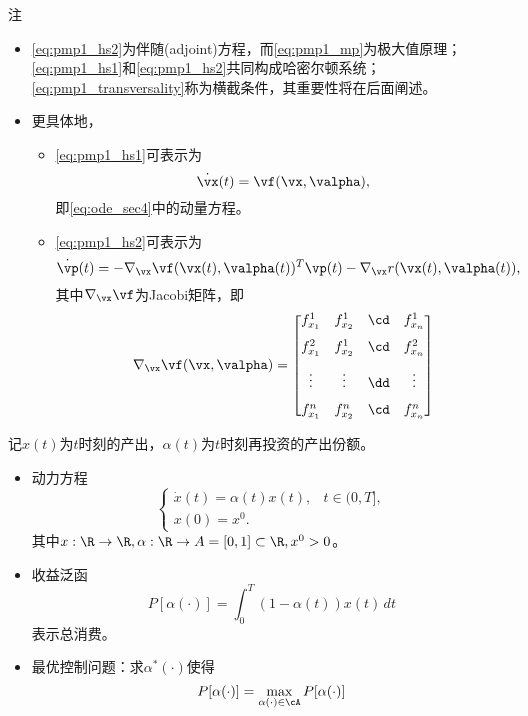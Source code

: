 \begin{frame}{\subsecname}
    \begin{block}{注}
    \begin{itemize}
        \item \eqref{eq:pmp1_hs2}为伴随(adjoint)方程，而\eqref{eq:pmp1_mp}为极大值原理；\eqref{eq:pmp1_hs1}和\eqref{eq:pmp1_hs2}共同构成哈密尔顿系统；\eqref{eq:pmp1_transversality}称为横截条件，其重要性将在后面阐述。
        \item 更具体地，
        \begin{itemize}
        \item \eqref{eq:pmp1_hs1}可表示为
        $$
        \dot \vx(t)=\vf(\vx,\valpha),
        $$
        即\eqref{eq:ode_sec4}中的动量方程。\\[.1in]
        \item \eqref{eq:pmp1_hs2}可表示为
        $$
        \dot \vp(t)= - \nabla_{\vx} \vf(\vx(t),\valpha(t))^T \vp(t) - \nabla_\vx r(\vx(t),\valpha(t)),
        $$
        其中$\nabla_{\vx} \vf$为Jacobi矩阵，即
        $$
        \nabla_{\vx} \vf(\vx,\valpha) =
        \begin{bmatrix}
        f_{x_1}^1 & f_{x_2}^1 & \cd & f_{x_n}^1  \\[.1in]
        f_{x_1}^2 & f_{x_2}^1 & \cd & f_{x_n}^2  \\[.1in]
        \vdots & \vdots & \dd & \vdots  \\[.1in]
        f_{x_1}^n & f_{x_2}^n & \cd & f_{x_n}^n  
        \end{bmatrix}
        $$
        \end{itemize}
    \end{itemize}
    \end{block}
\end{frame}

\begin{frame}{\subsecname}
\begin{example}[经济消费的简单控制问题]
 记$x(t)$为$t$时刻的产出，$\alpha(t)$为$t$时刻再投资的产出份额。
 \begin{itemize}
 \item 动力方程 
 $$
 \left\{
 \begin{array}{lc}
      \dot x(t)=\alpha(t)x(t), & t \in (0, T], \\[.05in]
      x(0) = x^0. & 
 \end{array}
 \right.
 $$
 其中$x:\R\to \R, \alpha:\R\to A=[0,1]\subset \R, x^0>0$。\\[.1in]
 \item 收益泛函 
 $$
 P[\alpha(\cdot)] = \int_0^T (1-\alpha(t))x(t)\,dt
 $$
 表示总消费。
 \\[.1in]
 \item 最优控制问题：求$\alpha^*(\cdot)$使得
 $$
 P[\alpha(\cdot)] = \max_{\alpha(\cdot)\in \cA} P[\alpha(\cdot)] 
 $$
 \end{itemize} 
\end{example}
\end{frame}

